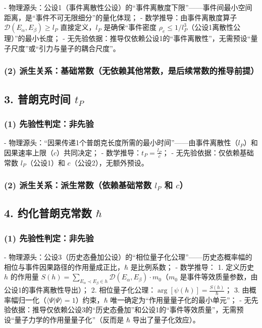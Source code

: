 \documentclass{article}
\begin{document}
- 物理源头：公设1（事件离散性公设）的“事件离散度下限”——事件间最小空间距离，是“事件不可无限细分”的量化体现；
- 数学推导：由事件离散度算子 \( \mathcal{D}(E_\alpha,E_\beta) \geq l_P \) 直接定义，\( l_P \) 是确保“事件密度 \( \rho_e \leq 1/l_P^3 \)（公设1离散性公理）”的最小长度；
- 无先验依据：推导仅依赖公设1的“事件离散性”，无需预设“量子尺度”或“引力与量子的耦合尺度”。

\subsubsection*{(2) 派生关系：基础常数（无依赖其他常数，是后续常数的推导前提）}

\subsection*{3. 普朗克时间 \( t_P \)}

\subsubsection*{(1) 先验性判定：非先验}

- 物理源头：“因果传递1个普朗克长度所需的最小时间”——由事件离散性（\( l_P \)）和因果速率上限（\( c \)）共同决定；
- 数学推导：\( t_P = \frac{l_P}{c} \)；
- 无先验依据：仅依赖基础常数 \( l_P \)（公设1）和 \( c \)（公设2），无额外预设。

\subsubsection*{(2) 派生关系：派生常数（依赖基础常数 \( l_P \) 和 \( c \)）}

\subsection*{4. 约化普朗克常数 \( \hbar \)}

\subsubsection*{(1) 先验性判定：非先验}

- 物理源头：公设3（历史态叠加公设）的“相位量子化公理”——历史态概率幅的相位与事件因果路径的作用量成正比，\( \hbar \) 是比例系数；
- 数学推导：
  1. 定义历史 \( h \) 的作用量 \( S(h) = \sum_{E_\alpha \prec E_\beta \in h} \mathcal{D}(E_\alpha,E_\beta) \cdot m_0 \)（\( m_0 \) 是事件等效质量参数，由公设1的事件离散性导出）；
  2. 相位量子化公理：\( \arg[\psi(h)] = \frac{S(h)}{\hbar} \)；
  3. 由概率幅归一化（\( \langle\Psi|\Psi\rangle=1 \)）约束，\( \hbar \) 唯一确定为“作用量量子化的最小单元”；
- 无先验依据：推导仅依赖公设3的“历史态叠加”和公设1的“事件等效质量”，无需预设“量子力学的作用量量子化”（反而是 \( \hbar \) 导出了量子化效应）。
\end{document}
